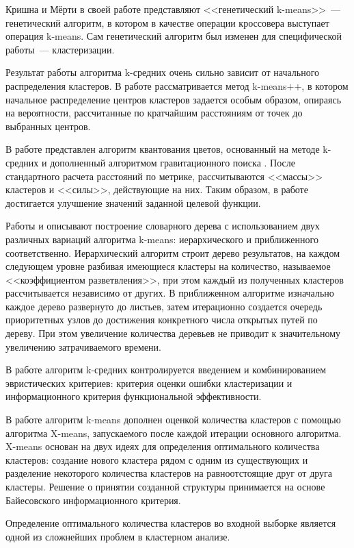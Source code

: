 Кришна и Мёрти в своей работе \cite{krishna} представляют <<генетический k-means>>~--- генетический алгоритм, в котором в качестве операции кроссовера выступает операция k-means. Сам генетический алгоритм был изменен для специфической работы~--- кластеризации.

Результат работы алгоритма k-средних очень сильно зависит от начального распределения кластеров. В работе \cite{kpp} рассматривается метод k-means++, в котором начальное распределение центров кластеров задается особым образом, опираясь на вероятности, рассчитанные по кратчайшим расстояниям от точек до выбранных центров.

В работе \cite{lenka} представлен алгоритм квантования цветов, основанный на методе k-средних и дополненный алгоритмом гравитационного поиска \cite{lenka8}. После стандартного расчета расстояний по метрике, рассчитываются <<массы>> кластеров и <<силы>>, действующие на них. Таким образом, в работе достигается улучшение значений заданной целевой функции.

Работы \cite{nister} и \cite{philbin} описывают построение словарного дерева с использованием двух различных вариаций алгоритма k-means: иерархического и приближенного соответственно. Иерархический алгоритм строит дерево результатов, на каждом следующем уровне разбивая имеющиеся кластеры на количество, называемое <<коэффициентом разветвления>>, при этом каждый из полученных кластеров рассчитывается независимо от других. В приближенном алгоритме изначально каждое дерево развернуто до листьев, затем итерационно создается очередь приоритетных узлов до достижения конкретного числа открытых путей по дереву. При этом увеличение количества деревьев не приводит к значительному увеличению затрачиваемого времени.

В работе \cite{ukraine} алгоритм k-средних контролируется введением и комбинированием эвристических критериев: критерия оценки ошибки кластеризации и информационного критерия функциональной эффективности.

В работе \cite{xmeans} алгоритм k-means дополнен оценкой количества кластеров с помощью алгоритма X-means, запускаемого после каждой итерации основного алгоритма. X-means основан на двух идеях для определения оптимального количества кластеров: создание нового кластера рядом с одним из существующих и разделение некоторого количества кластеров на равноотстоящие друг от друга кластеры. Решение о принятии созданной структуры принимается на основе Байесовского информационного критерия.

Определение оптимального количества кластеров во входной выборке является одной из сложнейших проблем в кластерном анализе. \cite{kpp, xmeans, numbers, silhouettes, rescale}

